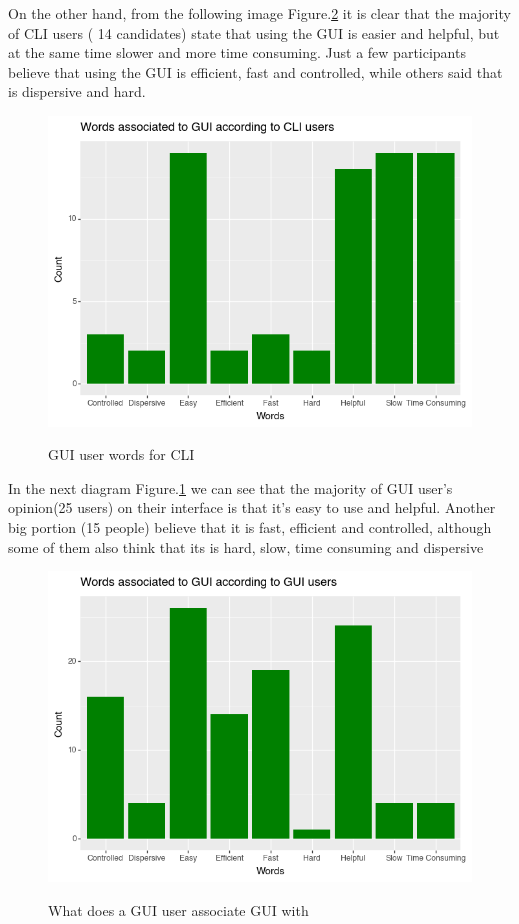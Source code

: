 \documentclass[]{report}
\begin{document}
	On the other hand, from the following image Figure.\ref{fig: 16} it is clear that the majority of CLI users ( 14 candidates) state that using the GUI is easier and helpful, but at the same time slower and more time consuming. Just a few participants believe that using the GUI is efficient, fast and controlled, while others said that is dispersive and hard.
	\begin{figure}[H]
		\centering
		\includegraphics[width=0.75\linewidth]{WordsGUIfromCLI}\\
		\caption{GUI user words for CLI}
		\label{fig: 17}
	\end{figure}
	
	In the next diagram Figure.\ref{fig: 17} we can see that the majority of GUI user's opinion(25 users) on their interface is that it's easy to use and helpful. Another big portion (15 people) believe that it is fast, efficient and controlled, although some of them also think that its is hard, slow, time consuming and dispersive
	
	\begin{figure}[H]
		\centering
		\includegraphics[width=0.75\linewidth]{WordsGUIfromGUI}\\
		\caption{What does a GUI user associate GUI with}
		\label{fig: 16}
	\end{figure}
	
\end{document}

